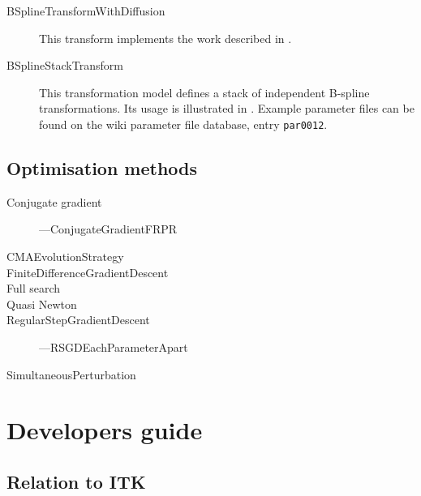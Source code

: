 \documentclass[]{report}
\newcommand{\elastix}{\texttt{elastix}}
\begin{document}
\begin{description}
\item[BSplineTransformWithDiffusion] This transform implements the work
    described in \cite{Staring07a}.

\item[BSplineStackTransform] This transformation model defines a stack of
    independent B-spline transformations. Its usage is illustrated in
    \cite{Metz11}. Example parameter files can be found on the wiki
    parameter file database, entry \texttt{par0012}.
\end{description}

\section{Optimisation methods}

\begin{description}
\item[Conjugate gradient]
---ConjugateGradientFRPR

\item[CMAEvolutionStrategy]

\item[FiniteDifferenceGradientDescent]

\item[Full search]

\item[Quasi Newton]


\item[RegularStepGradientDescent]
---RSGDEachParameterApart

\item[SimultaneousPerturbation]
\end{description}



\chapter{Developers guide}\label{chp:develop}


\section{Relation to ITK}

%
%
\end{document}
